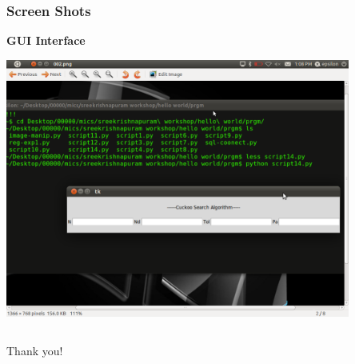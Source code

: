 \documentclass[10pt]{beamer}
\begin{document}
\begin{frame}
	\frametitle{Screen Shots}
	\textbf{GUI Interface}
	\begin{center}
	\includegraphics[width=0.85\textwidth]{abb.png}
	\end{center}
\end{frame}

\begin{frame}
  \begin{columns}
    \begin{column}{0.2\textwidth}
      Thank you!
    \end{column}
  \end{columns}
\end{frame}
\end{document}
